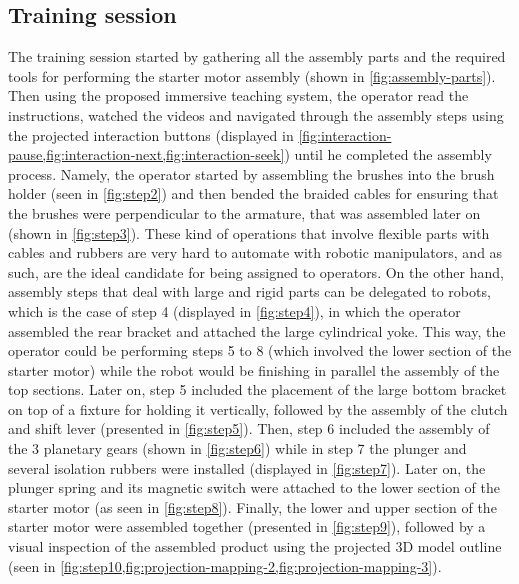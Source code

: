 \subsection{Training session}

The training session started by gathering all the assembly parts and the required tools for performing the starter motor assembly (shown in \cref{fig:assembly-parts}). Then using the proposed immersive teaching system, the operator read the instructions, watched the videos and navigated through the assembly steps using the projected interaction buttons (displayed in \cref{fig:interaction-pause,fig:interaction-next,fig:interaction-seek}) until he completed the assembly process. Namely, the operator started by assembling the brushes into the brush holder (seen in \cref{fig:step2}) and then bended the braided cables for ensuring that the brushes were perpendicular to the armature, that was assembled later on (shown in \cref{fig:step3}). These kind of operations that involve flexible parts with cables and rubbers are very hard to automate with robotic manipulators, and as such, are the ideal candidate for being assigned to operators. On the other hand, assembly steps that deal with large and rigid parts can be delegated to robots, which is the case of step 4 (displayed in \cref{fig:step4}), in which the operator assembled the rear bracket and attached the large cylindrical yoke. This way, the operator could be performing steps 5 to 8 (which involved the lower section of the starter motor) while the robot would be finishing in parallel the assembly of the top sections. Later on, step 5 included the placement of the large bottom bracket on top of a fixture for holding it vertically, followed by the assembly of the clutch and shift lever (presented in \cref{fig:step5}). Then, step 6 included the assembly of the 3 planetary gears (shown in \cref{fig:step6}) while in step 7 the plunger and several isolation rubbers were installed (displayed in \cref{fig:step7}). Later on, the plunger spring and its magnetic switch were attached to the lower section of the starter motor (as seen in \cref{fig:step8}). Finally, the lower and upper section of the starter motor were assembled together (presented in \cref{fig:step9}), followed by a visual inspection of the assembled product using the projected 3D model outline (seen in \cref{fig:step10,fig:projection-mapping-2,fig:projection-mapping-3}).

